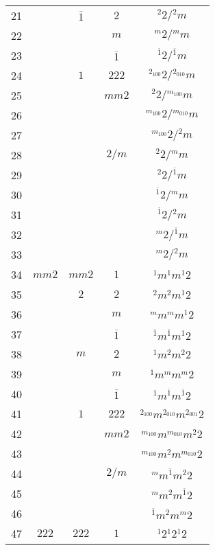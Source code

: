 \begin{longtable}{ccccc}
  21 &  & $\overline{1}$ & $2$ & ${}^{2} 2  / {}^{2} m $\\
  22 &  &  & $m$ & ${}^{m} 2  / {}^{m} m $\\
  23 &  &  & $\overline{1}$ & ${}^{\overline{1}} 2  / {}^{\overline{1}} m $\\
  24 &  & $1$ & $222$ & ${}^{2_{100}} 2  / {}^{2_{010}} m $\\
  25 &  &  & $mm2$ & ${}^{2} 2  / {}^{m_{100}} m $\\
  26 &  &  &  & ${}^{m_{100}} 2  / {}^{m_{010}} m $\\
  27 &  &  &  & ${}^{m_{100}} 2  / {}^{2} m $\\
  28 &  &  & $2/m$ & ${}^{2} 2  / {}^{m} m $\\
  29 &  &  &  & ${}^{2} 2  / {}^{\overline{1}} m $\\
  30 &  &  &  & ${}^{\overline{1}} 2  / {}^{m} m $\\
  31 &  &  &  & ${}^{\overline{1}} 2  / {}^{2} m $\\
  32 &  &  &  & ${}^{m} 2  / {}^{\overline{1}} m $\\
  33 &  &  &  & ${}^{m} 2  / {}^{2} m $\\
  34 & $mm2$ & $mm2$ & $1$ & ${}^{1} m {}^{1} m {}^{1} 2 $\\
  35 &  & $2$ & $2$ & ${}^{2} m {}^{2} m {}^{1} 2 $\\
  36 &  &  & $m$ & ${}^{m} m {}^{m} m {}^{1} 2 $\\
  37 &  &  & $\overline{1}$ & ${}^{\overline{1}} m {}^{\overline{1}} m {}^{1} 2 $\\
  38 &  & $m$ & $2$ & ${}^{1} m {}^{2} m {}^{2} 2 $\\
  39 &  &  & $m$ & ${}^{1} m {}^{m} m {}^{m} 2 $\\
  40 &  &  & $\overline{1}$ & ${}^{1} m {}^{\overline{1}} m {}^{\overline{1}} 2 $\\
  41 &  & $1$ & $222$ & ${}^{2_{100}} m {}^{2_{010}} m {}^{2_{001}} 2 $\\
  42 &  &  & $mm2$ & ${}^{m_{100}} m {}^{m_{010}} m {}^{2} 2 $\\
  43 &  &  &  & ${}^{m_{100}} m {}^{2} m {}^{m_{010}} 2 $\\
  44 &  &  & $2/m$ & ${}^{m} m {}^{\overline{1}} m {}^{2} 2 $\\
  45 &  &  &  & ${}^{m} m {}^{2} m {}^{\overline{1}} 2 $\\
  46 &  &  &  & ${}^{\overline{1}} m {}^{2} m {}^{m} 2 $\\
  47 & $222$ & $222$ & $1$ & ${}^{1} 2 {}^{1} 2 {}^{1} 2 $\\

\end{longtable}

